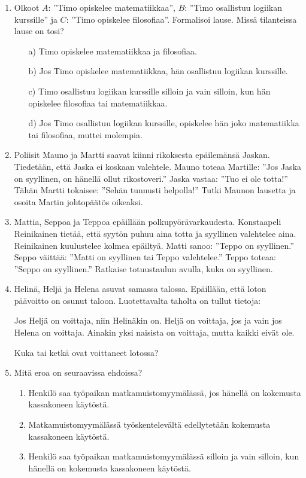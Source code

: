 \begin{enumerate}
\item
Olkoot $A$: ''Timo opiskelee matematiikkaa'', $B$: ''Timo osallistuu logiikan kurssille'' ja $C$: ''Timo opiskelee filosofiaa''. Formalisoi lause. Missä tilanteissa lause on tosi?
\begin{itemize}
\item[a)] Timo opiskelee matematiikkaa ja filosofiaa.
\item[b)] Jos Timo opiskelee matematiikkaa, hän osallistuu logiikan kurssille.
\item[c)] Timo osallistuu logiikan kurssille silloin ja vain silloin, kun hän opiskelee filosofiaa tai matematiikkaa.
\item[d)] Jos Timo osallistuu logiikan kurssille, opiskelee hän joko matematiikka tai filosofiaa, muttei molempia.
\end{itemize}


\item Poliisit Mauno ja Martti saavat kiinni rikoksesta epäilemänsä Jaskan. Tiedetään, että Jaska ei koskaan valehtele. Mauno toteaa Martille: ''Jos Jaska on syyllinen, on hänellä ollut rikostoveri.'' Jaska vastaa: ''Tuo ei ole totta!'' Tähän Martti tokaisee: ''Sehän tunnusti helpolla!'' Tutki Maunon lausetta ja osoita Martin johtopäätös oikeaksi.

\item Mattia, Seppoa ja Teppoa epäillään polkupyörävarkaudesta. Konstaapeli Reinikainen tietää, että syytön puhuu aina totta ja syyllinen valehtelee aina. Reinikainen kuulustelee kolmea epäiltyä. Matti sanoo: ''Teppo on syyllinen.'' Seppo väittää: ''Matti on syyllinen tai Teppo valehtelee.'' Teppo toteaa: ''Seppo on syyllinen.'' Ratkaise totuustaulun avulla, kuka on syyllinen. 

\item Helinä, Heljä ja Helena asuvat samassa talossa. Epäillään, että loton päävoitto on osunut taloon. Luotettavalta taholta on tullut tietoja:

Jos Heljä on voittaja, niin Helinäkin on. 
Heljä on voittaja, jos ja vain jos Helena on voittaja.
Ainakin yksi naisista on voittaja, mutta kaikki eivät ole.

Kuka tai ketkä ovat voittaneet lotossa?

\item
Mitä eroa on seuraavissa ehdoissa?
\begin{enumerate}
\item Henkilö saa työpaikan matkamuistomyymälässä, jos hänellä on kokemusta kassakoneen käytöstä.
\item Matkamuistomyymälässä työskentelevältä edellytetään kokemusta kassakoneen käytöstä.
\item 
Henkilö saa työpaikan matkamuistomyymälässä silloin ja vain silloin, kun hänellä on kokemusta kassakoneen käytöstä.
\end{enumerate}



\end{enumerate}

